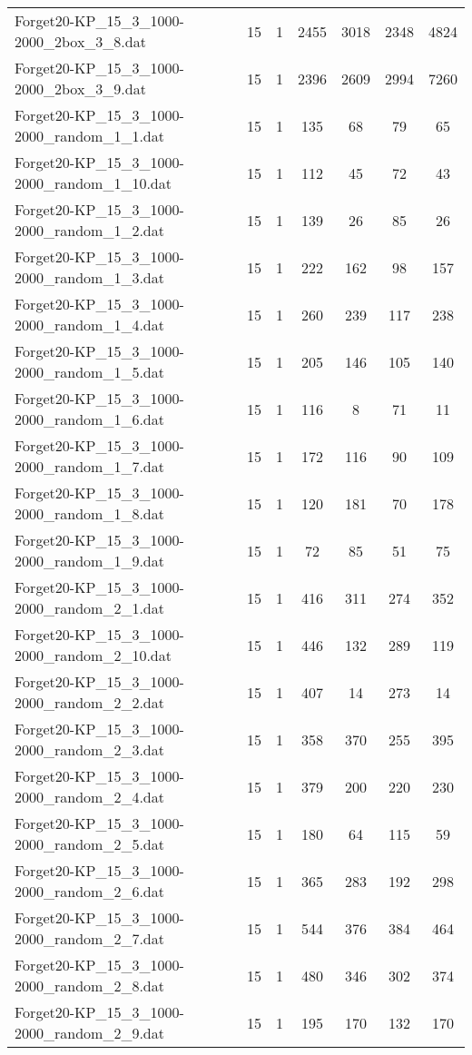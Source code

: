 \begin{table}[!ht]
\begin{tabular}{lcccccc}
Forget20-KP\_15\_3\_1000-2000\_2box\_3\_8.dat & 15 & 1 & 2455 & 3018 & 2348 & 4824 \\
Forget20-KP\_15\_3\_1000-2000\_2box\_3\_9.dat & 15 & 1 & 2396 & 2609 & 2994 & 7260 \\
Forget20-KP\_15\_3\_1000-2000\_random\_1\_1.dat & 15 & 1 & 135 & 68 & 79 & 65 \\
Forget20-KP\_15\_3\_1000-2000\_random\_1\_10.dat & 15 & 1 & 112 & 45 & 72 & 43 \\
Forget20-KP\_15\_3\_1000-2000\_random\_1\_2.dat & 15 & 1 & 139 & 26 & 85 & 26 \\
Forget20-KP\_15\_3\_1000-2000\_random\_1\_3.dat & 15 & 1 & 222 & 162 & 98 & 157 \\
Forget20-KP\_15\_3\_1000-2000\_random\_1\_4.dat & 15 & 1 & 260 & 239 & 117 & 238 \\
Forget20-KP\_15\_3\_1000-2000\_random\_1\_5.dat & 15 & 1 & 205 & 146 & 105 & 140 \\
Forget20-KP\_15\_3\_1000-2000\_random\_1\_6.dat & 15 & 1 & 116 & 8 & 71 & 11 \\
Forget20-KP\_15\_3\_1000-2000\_random\_1\_7.dat & 15 & 1 & 172 & 116 & 90 & 109 \\
Forget20-KP\_15\_3\_1000-2000\_random\_1\_8.dat & 15 & 1 & 120 & 181 & 70 & 178 \\
Forget20-KP\_15\_3\_1000-2000\_random\_1\_9.dat & 15 & 1 & 72 & 85 & 51 & 75 \\
Forget20-KP\_15\_3\_1000-2000\_random\_2\_1.dat & 15 & 1 & 416 & 311 & 274 & 352 \\
Forget20-KP\_15\_3\_1000-2000\_random\_2\_10.dat & 15 & 1 & 446 & 132 & 289 & 119 \\
Forget20-KP\_15\_3\_1000-2000\_random\_2\_2.dat & 15 & 1 & 407 & 14 & 273 & 14 \\
Forget20-KP\_15\_3\_1000-2000\_random\_2\_3.dat & 15 & 1 & 358 & 370 & 255 & 395 \\
Forget20-KP\_15\_3\_1000-2000\_random\_2\_4.dat & 15 & 1 & 379 & 200 & 220 & 230 \\
Forget20-KP\_15\_3\_1000-2000\_random\_2\_5.dat & 15 & 1 & 180 & 64 & 115 & 59 \\
Forget20-KP\_15\_3\_1000-2000\_random\_2\_6.dat & 15 & 1 & 365 & 283 & 192 & 298 \\
Forget20-KP\_15\_3\_1000-2000\_random\_2\_7.dat & 15 & 1 & 544 & 376 & 384 & 464 \\
Forget20-KP\_15\_3\_1000-2000\_random\_2\_8.dat & 15 & 1 & 480 & 346 & 302 & 374 \\
Forget20-KP\_15\_3\_1000-2000\_random\_2\_9.dat & 15 & 1 & 195 & 170 & 132 & 170 \\

\end{tabular}
\end{table}
